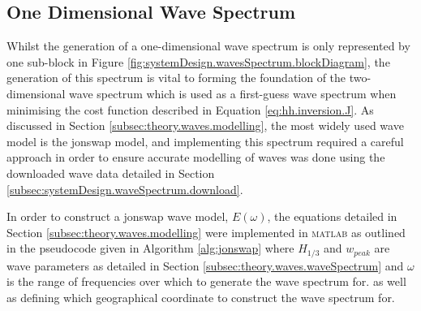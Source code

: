 
\subsection{One Dimensional Wave Spectrum} \label{subsec:systemDesign.waveSpectrum.1DSpectrum}

Whilst the generation of a one-dimensional wave spectrum is only represented by one sub-block in Figure \ref{fig:systemDesign.wavesSpectrum.blockDiagram}, the generation of this spectrum is vital to forming the foundation of the two-dimensional wave spectrum which is used as a first-guess wave spectrum when minimising the cost function described in Equation \ref{eq:hh.inversion.J}. As discussed in Section \ref{subsec:theory.waves.modelling}, the most widely used wave model is the \acs{jonswap} model, and implementing this spectrum required a careful approach in order to ensure accurate modelling of waves was done using the downloaded wave data detailed in Section \ref{subsec:systemDesign.waveSpectrum.download}.

In order to construct a \acs{jonswap} wave model, $E(\omega)$, the equations detailed in Section \ref{subsec:theory.waves.modelling} were implemented in \textsc{matlab} as outlined in the pseudocode given in Algorithm \ref{alg:jonswap} where $H_{1/3}$ and $w_{peak}$ are wave parameters as detailed in Section \ref{subsec:theory.waves.waveSpectrum} and $\omega$ is the range of frequencies over which to generate the wave spectrum for. as well as defining which geographical coordinate to construct the wave spectrum for. 


